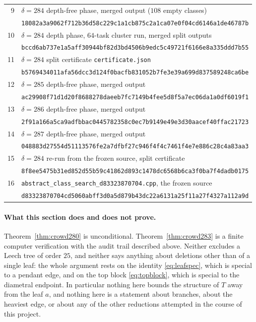 \documentclass[11pt,a4paper]{article}
\theoremstyle{plain}
\theoremstyle{remark}
\newcommand{\file}[1]{\texttt{#1}}
\begin{document}
\begin{table}[ht]
\begin{tabular}{@{}rl@{}}
9 & $\delta=284$ depth-free phase, merged output ($108$ empty classes)\\
  & \texttt{\scriptsize 18082a3a9062f712b36d58c229c1a1cb875c2a1ca07e0f04cd6146a1de46787b}\\
10 & $\delta=284$ depth phase, $64$-task cluster run, merged split outputs\\
   & \texttt{\scriptsize bccd6ab737e1a5aff30944bf82d3bd4506b9edc5c49721f6166e8a335ddd7b55}\\
11 & $\delta=284$ split certificate \file{certificate.json}\\
   & \texttt{\scriptsize b5769434011afa56dcc3d124f0bacfb831052b7fe3e39a699d837589248ca6be}\\
12 & $\delta=285$ depth-free phase, merged output\\
   & \texttt{\scriptsize ac29908f71d1d20f8688278daeeb7fc7149b4fee5d8f5a7ec06da1a0df6019f1}\\
13 & $\delta=286$ depth-free phase, merged output\\
   & \texttt{\scriptsize 2f91a166a5ca9adfbbac0445782358c0ec7b9149e49e3d30aacef40ffac21723}\\
14 & $\delta=287$ depth-free phase, merged output\\
   & \texttt{\scriptsize 048883d27554d51113576fe2a7dfbf27c946f4f4c7461f4e7e886c28c4a83aa3}\\
15 & $\delta=284$ re-run from the frozen source, split certificate\\
   & \texttt{\scriptsize 8f8ee5475b31ed852d55b59c41862d893c1478dc6568b6ca3f0ba7f4dadb0175}\\
16 & \file{abstract\_class\_search\_d83323870704.cpp}, the frozen source\\
   & \texttt{\scriptsize d83323870704cd5060abff3d0a5d879b43dc22a6131a25f11a27f4327a112a9d}\\
\bottomrule
\end{tabular}
\end{table}

\paragraph{What this section does and does not prove.}
Theorem~\ref{thm:crowd280} is unconditional.  Theorem~\ref{thm:crowd283} is a
finite computer verification with the audit trail described above.  Neither
excludes a Leech tree of order $25$, and neither says anything about deletions
other than of a single leaf: the whole argument rests on the identity
\eqref{eq:leafspec}, which is special to a pendant edge, and on the top block
\eqref{eq:topblock}, which is special to the diametral endpoint.  In particular
nothing here bounds the structure of $T$ away from the leaf $a$, and nothing
here is a statement about branches, about the heaviest edge, or about any of the
other reductions attempted in the course of this project.
\end{document}
